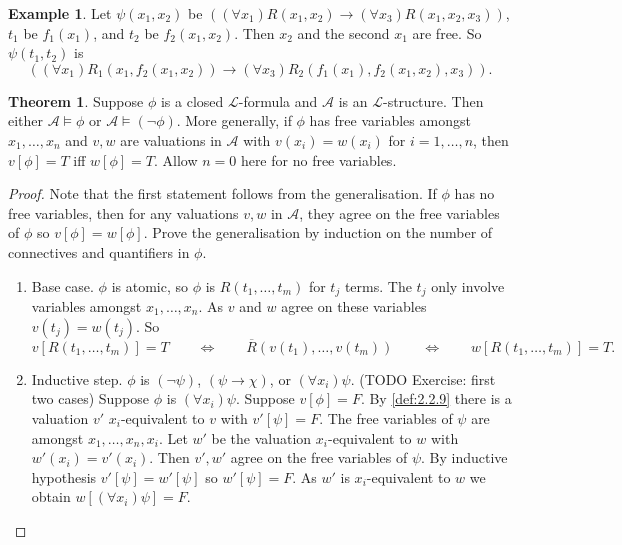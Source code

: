 \documentclass{article}
\newcommand{\A}{\mathcal{A}}
\renewcommand{\L}{\mathcal{L}}
\newcommand{\rb}[1]{\left( #1 \right)}
\renewcommand{\sb}[1]{\left[ #1 \right]}
\newcommand{\notb}[1]{\rb{\neg #1}}
\newcommand{\impb}[2]{\rb{#1 \rightarrow #2}}
\newcommand{\fab}[1]{\rb{\forall #1}}
\theoremstyle{definition}\newtheorem{definition}{Definition}[subsection]
\theoremstyle{definition}\newtheorem{remark}[definition]{Remark}
\theoremstyle{definition}\newtheorem*{example}{Example}
\theoremstyle{definition}\newtheorem*{note}{Note}
\newtheorem{theorem}[definition]{Theorem}
\begin{document}
\begin{example}
Let $ \psi\rb{x_1, x_2} $ be $ \impb{\fab{x_1}R\rb{x_1, x_2}}{\fab{x_3}R\rb{x_1, x_2, x_3}} $, $ t_1 $ be $ f_1\rb{x_1} $, and $ t_2 $ be $ f_2\rb{x_1, x_2} $. Then $ x_2 $ and the second $ x_1 $ are free. So $ \psi\rb{t_1, t_2} $ is
$$ \impb{\fab{x_1}R_1\rb{x_1, f_2\rb{x_1, x_2}}}{\fab{x_3}R_2\rb{f_1\rb{x_1}, f_2\rb{x_1, x_2}, x_3}}. $$
\end{example}

\begin{theorem}
\label{thm:2.3.3}
Suppose $ \phi $ is a closed $ \L $-formula and $ \A $ is an $ \L $-structure. Then either $ \A \vDash \phi $ or $ \A \vDash \notb{\phi} $. More generally, if $ \phi $ has free variables amongst $ x_1, \dots, x_n $ and $ v, w $ are valuations in $ \A $ with $ v\rb{x_i} = w\rb{x_i} $ for $ i = 1, \dots, n $, then $ v\sb{\phi} = T $ iff $ w\sb{\phi} = T $. Allow $ n = 0 $ here for no free variables.
\end{theorem}

\begin{proof}
Note that the first statement follows from the generalisation. If $ \phi $ has no free variables, then for any valuations $ v, w $ in $ \A $, they agree on the free variables of $ \phi $ so $ v\sb{\phi} = w\sb{\phi} $. Prove the generalisation by induction on the number of connectives and quantifiers in $ \phi $.
\begin{enumerate}
\item Base case. $ \phi $ is atomic, so $ \phi $ is $ R\rb{t_1, \dots, t_m} $ for $ t_j $ terms. The $ t_j $ only involve variables amongst $ x_1, \dots, x_n $. As $ v $ and $ w $ agree on these variables $ v\rb{t_j} = w\rb{t_j} $. So
$$ v\sb{R\rb{t_1, \dots, t_m}} = T \qquad \iff \qquad \overline{R}\rb{v\rb{t_1}, \dots, v\rb{t_m}} \qquad \iff \qquad w\sb{R\rb{t_1, \dots, t_m}} = T. $$
\item Inductive step. $ \phi $ is $ \notb{\psi} $, $ \impb{\psi}{\chi} $, or $ \fab{x_i}\psi $. (TODO Exercise: first two cases) Suppose $ \phi $ is $ \fab{x_i}\psi $. Suppose $ v\sb{\phi} = F $. By \ref{def:2.2.9} there is a valuation $ v' $ $ x_i $-equivalent to $ v $ with $ v'\sb{\psi} = F $. The free variables of $ \psi $ are amongst $ x_1, \dots, x_n, x_i $. Let $ w' $ be the valuation $ x_i $-equivalent to $ w $ with $ w'\rb{x_i} = v'\rb{x_i} $. Then $ v', w' $ agree on the free variables of $ \psi $. By inductive hypothesis $ v'\sb{\psi} = w'\sb{\psi} $ so $ w'\sb{\psi} = F $. As $ w' $ is $ x_i $-equivalent to $ w $ we obtain $ w\sb{\fab{x_i}\psi} = F $.
\end{enumerate}
\end{proof}
\end{document}
